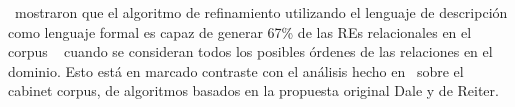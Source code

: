 
\cite{arec2:2008:Areces}~mostraron que el algoritmo de refinamiento utilizando el lenguaje de descripci\'on \el como lenguaje formal es capaz de generar 67\% de
las REs relacionales en el corpus ~\cite{viethen06:_algor_for_gener_refer_expres} cuando se consideran todos los posibles \'ordenes de las relaciones en el dominio. Esto est\'a en marcado contraste con el an\'alisis hecho en~\cite{viethen06:_algor_for_gener_refer_expres} sobre el cabinet corpus, de algoritmos basados en la propuesta original Dale y de Reiter.




